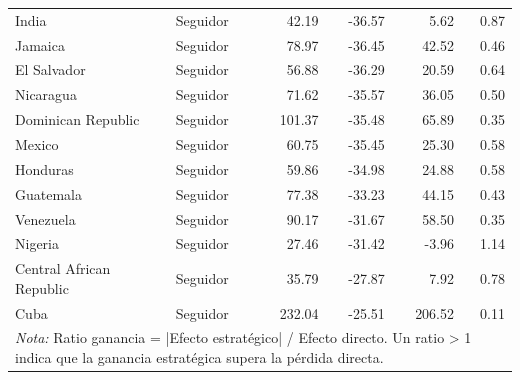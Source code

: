 \begin{table}[!h]
{\begin{tabular}[t]{llrrrr}
India & Seguidor & 42.19 & -36.57 & 5.62 & 0.87\\
Jamaica & Seguidor & 78.97 & -36.45 & 42.52 & 0.46\\
\addlinespace
El Salvador & Seguidor & 56.88 & -36.29 & 20.59 & 0.64\\
Nicaragua & Seguidor & 71.62 & -35.57 & 36.05 & 0.50\\
Dominican Republic & Seguidor & 101.37 & -35.48 & 65.89 & 0.35\\
Mexico & Seguidor & 60.75 & -35.45 & 25.30 & 0.58\\
Honduras & Seguidor & 59.86 & -34.98 & 24.88 & 0.58\\
\addlinespace
Guatemala & Seguidor & 77.38 & -33.23 & 44.15 & 0.43\\
Venezuela & Seguidor & 90.17 & -31.67 & 58.50 & 0.35\\
Nigeria & Seguidor & 27.46 & -31.42 & -3.96 & 1.14\\
Central African Republic & Seguidor & 35.79 & -27.87 & 7.92 & 0.78\\
Cuba & Seguidor & 232.04 & -25.51 & 206.52 & 0.11\\
\bottomrule
\multicolumn{6}{l}{\rule{0pt}{1em}\textit{Nota:} Ratio ganancia = |Efecto estratégico| / Efecto directo. Un ratio > 1 indica que la ganancia estratégica supera la pérdida directa.}\\
\end{tabular}}
\end{table}
